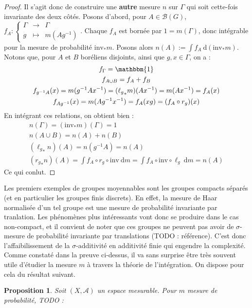 \documentclass[a4paper,12pt]{article}
\newtheorem{proposition}[theorem]{Proposition}
\newcommand{\Bor}{\mathcal{B}}
\newcommand{\indic}{\mathbbm{1}}
\newcommand{\integral}[2]{\int #1~\mathrm{d}#2}
\newcommand\fundef[3]{#1: \left\{\begin{array}{ccc}#2\\#3\end{array}\right.}
\newcommand{\inv}{^{-1}}
\newcommand{\comp}{\circ}
\newcommand{\invop}{\mathrm{inv}}
\newcommand{\TODO}[1]{{\color{red}TODO :} #1}
\begin{document}
\begin{proof}
    Il s'agit donc de construire une \textbf{autre} mesure $n$ sur $\Gamma$ qui soit cette-fois invariante des deux côtés.
    Posons d'abord, pour $A\in\Bor(G)$, $\fundef{f_A}{\Gamma&\to& \Gamma}{g&\mapsto& m(Ag\inv)}$. Chaque $f_A$ est bornée par $1 = m(\Gamma)$, 
    donc intégrable pour la mesure de probabilité $\invop_*m$. Posons alors $n(A) := \integral{f_A}{(\invop_*m)}$. \\
    Notons que, pour $A$ et $B$ boréliens disjoints, ainsi que $g, x\in\Gamma$, on a :
    \begin{gather*}
        f_\Gamma = \indic \\
        f_{A\cup B} = f_A + f_B \\
        f_{g\inv A}(x) = m(g\inv Ax\inv) = ({\ell_g}_*m)(Ax\inv) = m(Ax\inv) = f_A(x) \\
        f_{Ag\inv}(x) = m(Ag\inv x\inv) = f_A(xg) = (f_A \comp r_g)(x)
    \end{gather*}
    En intégrant ces relations, on obtient bien :
    \begin{gather*}
        n(\Gamma) = (\invop_*m)(\Gamma) = 1 \\
        n(A\cup B) = n(A) + n(B) \\
        ({\ell_g}_*n)(A) = n(g\inv A) = n(A) \\
        ({r_g}_*n)(A) = \integral{f_A\comp r_g\comp\invop}{m} = \integral{f_A\comp\invop\comp \ell_g}{m} = n(A)
    \end{gather*}
    Ce qui conlut.
\end{proof}

Les premiers exemples de groupes moyennables sont les groupes compacts séparés (et en particulier les groupes finis discrets).
En effet, la mesure de Haar normalisée d'un tel groupe est une mesure de probabilité invariante par tranlation. Les phénomènes
plus intéressants vont donc se produire dans le cas non-compact, et il convient de noter que ces groupes ne peuvent pas avoir
de $\sigma$-mesure de probabilité invariante par translations (\TODO{référence}). C'est donc l'affaibilissement de la 
$\sigma$-additivité en additivité finie qui engendre la complexité. \\

Comme constaté dans la preuve ci-dessus, il va sans surprise être très souvent utile d'étudier la mesure $m$ à travers la théorie de l'intégration.
On dispose pour cela du résultat suivant.
\begin{proposition}\label{repr}
    Soit $(X, \mathcal{A})$ un espace mesurable. Pour $m$ mesure de probabilité, \TODO{}
\end{proposition}
\end{document}
